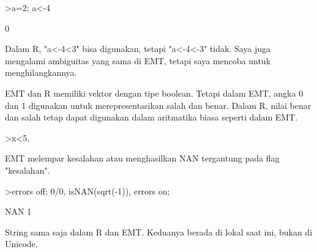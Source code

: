 \documentclass[12pt,arial,letterpaper]{book}
\begin{document}
\begin{eulernootebook}
\begin{eulercomment}
\begin{eulercomment}
\begin{eulernootebook}
\begin{eulercomment}
\begin{eulercomment}
\begin{eulercomment}
\begin{eulercomment}
\begin{eulercomment}
\begin{eulercomment}
\begin{eulercomment}
\begin{eulercomment}
\begin{eulercomment}
\begin{eulercomment}
\begin{eulercomment}
\begin{eulerprompt}
>a=2; a<-4
\end{eulerprompt}
\begin{euleroutput}
  0
\end{euleroutput}
\begin{eulercomment}
Dalam R, "a\textless{}-4\textless{}3" bisa digunakan, tetapi "a\textless{}-4\textless{}-3" tidak. Saya juga
mengalami ambiguitas yang sama di EMT, tetapi saya mencoba untuk
menghilangkannya.

EMT dan R memiliki vektor dengan tipe boolean. Tetapi dalam EMT, angka
0 dan 1 digunakan untuk merepresentasikan salah dan benar. Dalam R,
nilai benar dan salah tetap dapat digunakan dalam aritmatika biasa
seperti dalam EMT.
\end{eulercomment}
\begin{eulerprompt}
>x<5, %
\end{eulerprompt}
\begin{euleroutput}
  [0,  0,  1,  0,  0]
  [0,  0,  3.1,  0,  0]
\end{euleroutput}
\begin{eulercomment}
EMT melempar kesalahan atau menghasilkan NAN tergantung pada flag
"kesalahan".
\end{eulercomment}
\begin{eulerprompt}
>errors off; 0/0, isNAN(sqrt(-1)), errors on;
\end{eulerprompt}
\begin{euleroutput}
  NAN
  1
\end{euleroutput}
\begin{eulercomment}
String sama saja dalam R dan EMT. Keduanya berada di lokal saat ini,
bukan di Unicode.


\end{eulercomment}
\end{eulercomment}
\end{eulercomment}
\end{eulercomment}
\end{eulercomment}
\end{eulercomment}
\end{eulercomment}
\end{eulercomment}
\end{eulercomment}
\end{eulercomment}
\end{eulercomment}
\end{eulercomment}
\end{eulernootebook}
\end{eulercomment}
\end{eulercomment}
\end{eulernootebook}
\end{document}
